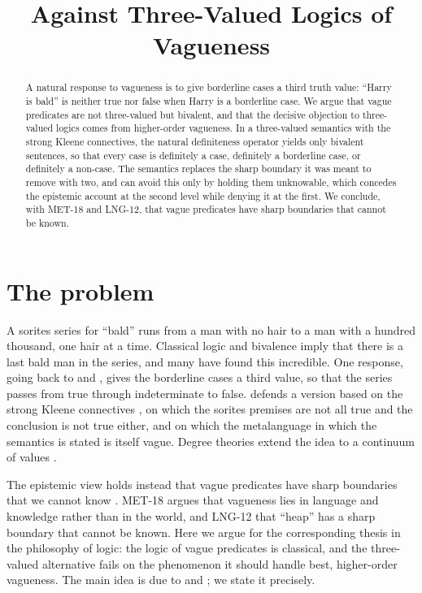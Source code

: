 \documentclass{situationist-preprint}
\title{Against Three-Valued Logics of Vagueness}
\begin{document}
\maketitle

\begin{abstract}
A natural response to vagueness is to give borderline cases a third truth value: \enquote{Harry is bald} is neither true nor false when Harry is a borderline case. We argue that vague predicates are not three-valued but bivalent, and that the decisive objection to three-valued logics comes from higher-order vagueness. In a three-valued semantics with the strong Kleene connectives, the natural definiteness operator yields only bivalent sentences, so that every case is definitely a case, definitely a borderline case, or definitely a non-case. The semantics replaces the sharp boundary it was meant to remove with two, and can avoid this only by holding them unknowable, which concedes the epistemic account at the second level while denying it at the first. We conclude, with MET-18 and LNG-12, that vague predicates have sharp boundaries that cannot be known.
\end{abstract}

\section{The problem}

A sorites series for \enquote{bald} runs from a man with no hair to a man with a hundred thousand, one hair at a time. Classical logic and bivalence imply that there is a last bald man in the series, and many have found this incredible. One response, going back to \citet{Hallden1949} and \citet{Korner1960}, gives the borderline cases a third value, so that the series passes from true through indeterminate to false. \citet{Tye1994} defends a version based on the strong Kleene connectives \citep{Kleene1952}, on which the sorites premises are not all true and the conclusion is not true either, and on which the metalanguage in which the semantics is stated is itself vague. Degree theories extend the idea to a continuum of values \citep{Smith2008}.

The epistemic view holds instead that vague predicates have sharp boundaries that we cannot know \citep{Williamson1994}. MET-18 argues that vagueness lies in language and knowledge rather than in the world, and LNG-12 that \enquote{heap} has a sharp boundary that cannot be known. Here we argue for the corresponding thesis in the philosophy of logic: the logic of vague predicates is classical, and the three-valued alternative fails on the phenomenon it should handle best, higher-order vagueness. The main idea is due to \citet{Williamson1994} and \citet{Keefe2000}; we state it precisely.
\end{document}
